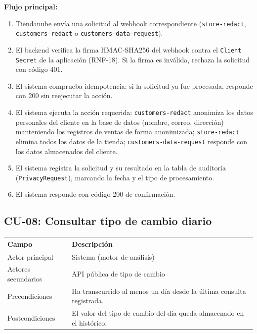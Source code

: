 \noindent\textbf{Flujo principal:}
\begin{enumerate}
    \item Tiendanube envía una solicitud al webhook correspondiente (\texttt{store-redact}, \texttt{customers-redact} o \texttt{customers-data-request}).
    \item El backend verifica la firma HMAC-SHA256 del webhook contra el \texttt{Client Secret} de la aplicación (RNF-18). Si la firma es inválida, rechaza la solicitud con código 401.
    \item El sistema comprueba idempotencia: si la solicitud ya fue procesada, responde con 200 sin reejecutar la acción.
    \item El sistema ejecuta la acción requerida: \texttt{customers-redact} anonimiza los datos personales del cliente en la base de datos (nombre, correo, dirección) manteniendo los registros de ventas de forma anonimizada; \texttt{store-redact} elimina todos los datos de la tienda; \texttt{customers-data-request} responde con los datos almacenados del cliente.
    \item El sistema registra la solicitud y su resultado en la tabla de auditoría (\texttt{PrivacyRequest}), marcando la fecha y el tipo de procesamiento.
    \item El sistema responde con código 200 de confirmación.
\end{enumerate}

\subsection{CU-08: Consultar tipo de cambio diario}
\label{sec:cu-08}

\begin{table}[h]
\centering
\renewcommand{\arraystretch}{1.3}
\begin{tabular}{|m{3cm}|m{11.3cm}|}
\hline
\textbf{Campo} & \textbf{Descripción} \\
\hline
Actor principal & Sistema (motor de análisis) \\
\hline
Actores secundarios & API pública de tipo de cambio \\
\hline
Precondiciones & Ha transcurrido al menos un día desde la última consulta registrada. \\
\hline
Postcondiciones & El valor del tipo de cambio del día queda almacenado en el histórico. \\
\hline
\end{tabular}
\end{table}


